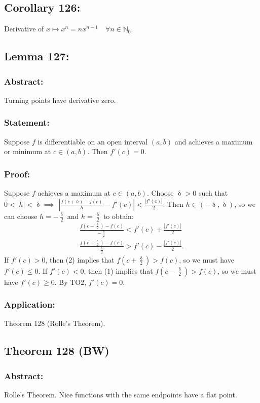 \documentclass{article}
\DeclareMathOperator\del{\delta}
\begin{document}
\subsection{Corollary 126:}
Derivative of $x \mapsto x^n = nx^{n-1} \quad \forall n \in \mathbb{N}_0$.

\subsection{Lemma 127:}
\subsubsection*{Abstract:}
Turning points have derivative zero.
\subsubsection*{Statement:}
Suppose $f$ is differentiable on an open interval $(a,b)$ and achieves
 a maximum or minimum at $c \in (a,b)$. Then $f'(c) = 0$.
\subsubsection*{Proof:}
Suppose $f$ achieves a maximum at $c \in (a,b)$. Choose $\del>0$ such that
$0<|h|<\del \implies$
$|\frac{f(c+h)-f(c)}{h}-f'(c)|<\frac{|f'(c)|}{2}$. Then $h \in (-\del,\del)$, so
we can choose $h = -\frac{\del}{2}$ and $h = \frac{\del}{2}$ to obtain:
\begin{gather}
\frac{f(c-\frac{\del}{2})-f(c)}  {-\frac{\del}{2}} <f'(c)+\frac{|f'(c)|}{2}  \\
\frac{f(c+\frac{\del}{2})-f(c)}  {\frac{\del}{2}} >f'(c)-\frac{|f'(c)|}{2}.
\end{gather}
If $f'(c)>0$, then (2) implies that $f(c+\frac{\del}{2})>f(c)$, so we must have $f'(c) \leq 0$.
If $f'(c)<0$, then (1) implies that $f(c-\frac{\del}{2})>f(c)$, so we must have $f'(c) \geq 0$.
By TO2, $f'(c) = 0$.
\subsubsection*{Application:}
Theorem 128 (Rolle's Theorem).
\subsection{Theorem 128 (BW)}
\subsubsection*{Abstract:}
Rolle's Theorem. Nice functions with the same endpoints have a flat point.
\end{document}

